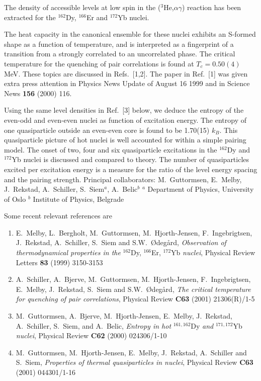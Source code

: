 The density of accessible levels at low spin in the ($^3$He,$\alpha
\gamma$) reaction has been extracted for the $^{162}$Dy, $^{166}$Er and
$^{172}$Yb nuclei. 

The heat capacity in the canonical ensemble for these nuclei
exhibits an S-formed shape as a function of
      temperature, and is interpreted as a fingerprint 
of a transition from a strongly correlated to an uncorrelated phase. 
The critical
temperature for the quenching of pair correlations is found at $T_c=0.50(4)$ 
MeV. 
These topics are discussed in Refs.~[1,2].  
The paper in Ref.~[1] was given extra press attention in 
Physics News Update of August 16 1999 and in Science 
News {\bf 156} (2000) 116.  

Using the same level densities in Ref.~[3] below,
we deduce the entropy of the even-odd and even-even nuclei 
as function of excitation energy.
The entropy of one quasiparticle outside an even-even core is found to be 1.70(15) $k_B$. This
 quasiparticle picture of hot nuclei is well accounted for within a simple pairing model. The
onset of two, four and six quasiparticle excitations in the $^{162}$Dy and $^{172}$Yb nuclei is 
discussed and compared to theory. The number of quasiparticles excited per excitation energy
 is a measure for the ratio of the level energy spacing and the pairing strength.  \newline\newline 
Principal collaborators: M.\ Guttormsen, E.~Melby, J.~Rekstad, A.~Schiller, S.~Siem$^a$, 
A.\ Belic$^b$\newline 
${}^a$ Department of Physics,
University of Oslo\newline
${}^b$ Institute  of Physics, Belgrade\newline

Some recent relevant references are
\begin{enumerate}
\item  E.\ Melby, L.\ Bergholt, M.\ Guttormsen, M.\ Hjorth-Jensen,
       F.\ Ingebrigtsen, J.\ Rekstad, A.\ Schiller, S.\ Siem and
       S.W.\ \O deg\aa rd,  
       {\em Observation of thermodynamical properties in the} 
       $^{162}$Dy, $^{166}$Er, $^{172}$Yb {\em nuclei},
       Physical Review Letters {\bf 83} (1999) 3150-3153
\item  A.\ Schiller, A.\ Bjerve, M.\ Guttormsen, M.\ Hjorth-Jensen,
       F.\ Ingebrigtsen, E.\ Melby,  J.\ Rekstad,  S.\ Siem and
       S.W.\ \O deg\aa rd,  
       {\em The critical temperature for quenching of pair correlations},
       Physical Review {\bf C63} (2001) 21306(R)/1-5
\item  M.\ Guttormsen, A.\ Bjerve, M.\ Hjorth-Jensen,
       E.\ Melby,  J.\ Rekstad, A.\ Schiller, S.\ Siem, and A.~Belic,       {\em Entropy in hot} 
       $^{161,162}$Dy {\em and} $^{171,172}$Yb {\em nuclei},
       Physical Review {\bf C62} (2000) 024306/1-10
\item  M.\ Guttormsen, M.\ Hjorth-Jensen, E.\ Melby,  
       J.\ Rekstad,  A.\ Schiller and S.\ Siem,
       {\em Properties of thermal quasiparticles in nuclei},
       Physical Review {\bf C63} (2001) 044301/1-16
\end{enumerate}


